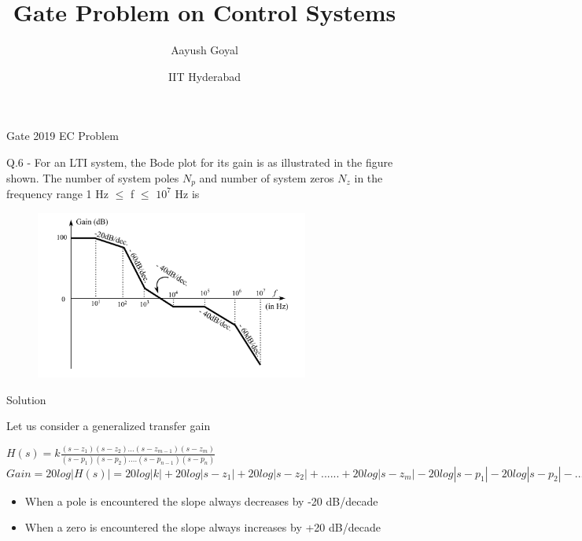 \documentclass{beamer}
\title{Gate Problem on Control Systems}
\author{Aayush Goyal}
\date{IIT Hyderabad}
\begin{document}
\maketitle

\begin{frame}{Gate 2019 EC Problem}
\begin{flushleft}
    

\textsf{Q.6 - For an LTI system, the Bode plot for its gain is as illustrated in the figure shown. The number of system poles $N_{p}$ and number of system zeros $N_{z}$ in the frequency range 1 Hz $\leq$ f $\leq$ $10^{7}$ Hz is}
\end{flushleft}

\begin{figure}[htp]
    \centering
    \includegraphics[width=9cm]{figure}
    
    \label{fig:galaxy}
\end{figure}
\end{frame}
\begin{frame}{Solution}
\begin{flushleft}
\textsf{Let us consider a generalized transfer gain}
\end{flushleft}
\vspace{10pt}
$H(s) = k \frac{(s-z_{1})(s-z_{2})...(s-z_{m-1})(s-z_{m})}{(s-p_{1})(s-p_{2})....(s-p_{n-1})(s-p_{n})}$\vspace{18pt}
$Gain = 20log|H(s)| = 20log|k| + 20log|s-z_{1}| + 20log|s-z_{2}| + ...... + 20log|s-z_{m}| - 20log|s-p_{1}| - 20log|s-p_{2}| - ..... - 20log|s-p_{n}| $ \vspace{18pt}

\begin{itemize}
    \item  When a pole is encountered the slope always decreases by -20 dB/decade
    \item When a zero is encountered the slope always increases by +20 dB/decade
\end{itemize}
\end{frame}
\end{document}
